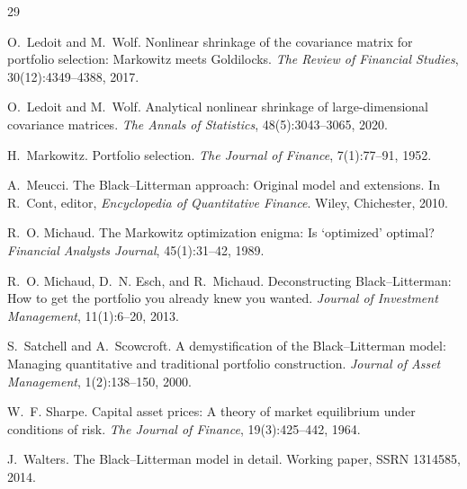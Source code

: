 \documentclass[a4paper,11pt]{article}
\theoremstyle{plain}
\theoremstyle{definition}
\begin{document}
\begin{thebibliography}{29}

O.~Ledoit and M.~Wolf.
\newblock Nonlinear shrinkage of the covariance matrix for portfolio
selection: Markowitz meets Goldilocks.
\newblock \emph{The Review of Financial Studies}, 30(12):4349--4388, 2017.

O.~Ledoit and M.~Wolf.
\newblock Analytical nonlinear shrinkage of large-dimensional
covariance matrices.
\newblock \emph{The Annals of Statistics}, 48(5):3043--3065, 2020.

H.~Markowitz.
\newblock Portfolio selection.
\newblock \emph{The Journal of Finance}, 7(1):77--91, 1952.


A.~Meucci.
\newblock The Black--Litterman approach: Original model and extensions.
\newblock In R.~Cont, editor, \emph{Encyclopedia of Quantitative
Finance}. Wiley, Chichester, 2010.

R.~O. Michaud.
\newblock The Markowitz optimization enigma: Is `optimized' optimal?
\newblock \emph{Financial Analysts Journal}, 45(1):31--42, 1989.

R.~O. Michaud, D.~N. Esch, and R.~Michaud.
\newblock Deconstructing Black--Litterman: How to get the portfolio you
already knew you wanted.
\newblock \emph{Journal of Investment Management}, 11(1):6--20, 2013.

S.~Satchell and A.~Scowcroft.
\newblock A demystification of the Black--Litterman model: Managing
quantitative and traditional portfolio construction.
\newblock \emph{Journal of Asset Management}, 1(2):138--150, 2000.

W.~F. Sharpe.
\newblock Capital asset prices: A theory of market equilibrium under
conditions of risk.
\newblock \emph{The Journal of Finance}, 19(3):425--442, 1964.

J.~Walters.
\newblock The Black--Litterman model in detail.
\newblock Working paper, SSRN 1314585, 2014.

\end{thebibliography}
\end{document}
